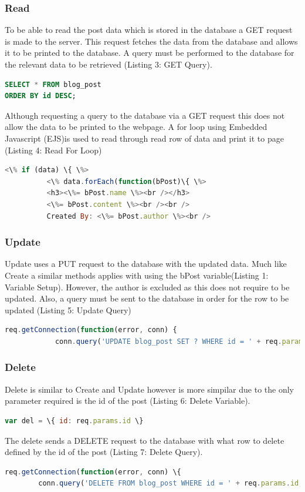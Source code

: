 \documentclass[10pt, a4paper]{article}
\begin{document}
\subsubsection {Read}
To be able to read the post data which is stored in the database a GET request is made to the server.  This request fetches the data from the database and allows it to be printed to the database.  A query must be performed to the database for the relevant data to be retrieved (Listing 3: GET Query).
\begin{lstlisting}[language=SQL,caption={GET Query}]
SELECT * FROM blog_post
ORDER BY id DESC;
\end{lstlisting}

Although requesting a query to the database via a GET request this does not allow the data to be printed to the webpage.  A for loop using Embedded Javascript (EJS)is  used to read through read row of data and print it to page (Listing 4: Read For Loop)
\begin{lstlisting}[language=javascript,caption={Read For Loop}]
  <\% if (data) \{ \%>
          <\% data.forEach(function(bPost)\{ \%>
          <h3><\%= bPost.name \%><br /></h3>
          <\%= bPost.content \%><br /><br />
          Created By: <\%= bPost.author \%><br />
\end{lstlisting}
\subsubsection{Update}
Update uses a PUT request to the database with the updated data.  Much like Create a similar methods applies with using the bPost variable(Listing 1: Variable Setup). However, the author is excluded as this does not require to be updated. Also, a query must be sent to the database in order for the row to be updated (Listing 5: Update Query)

\begin{lstlisting}[language=javascript,caption={Update Query}]
  req.getConnection(function(error, conn) {
            conn.query('UPDATE blog_post SET ? WHERE id = ' + req.params.id, bPost,
\end{lstlisting}
\subsubsection{Delete}
Delete is similar to Create and Update however is more simpilar due to the only parameter required is the id of the post (Listing 6: Delete Variable).  
\begin{lstlisting}[language=javascript,caption={Delete Variable}]
 var del = \{ id: req.params.id \}
\end{lstlisting}
The delete sends a DELETE request to the database with what row to delete defined by the id of the post (Listing 7: Delete Query). 
\begin{lstlisting}[language=javascript,caption=\{Delete Query\}]
req.getConnection(function(error, conn) \{
        conn.query('DELETE FROM blog_post WHERE id = ' + req.params.id, del,
\end{lstlisting}
\end{document}

